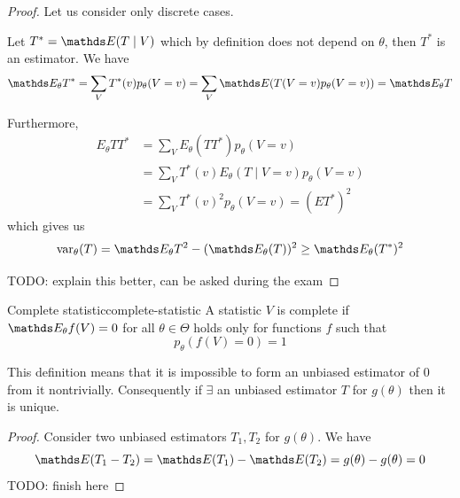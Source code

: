 \documentclass[12pt]{extarticle}
\begin{document}
\begin{proof}
	Let us consider only discrete cases.

	Let $T^* = \E(T\mid V)$ which by definition does not depend on $\theta$, then $T^*$ is an estimator.
	We have
	\begin{equation}
		\E_\theta T^* = \sum_V T^* (v) p_\theta(V = v) = \sum_V \E(T(V = v) p_\theta(V = v)) = \E_\theta T
	\end{equation}

	Furthermore,
	\begin{align}
		E_\theta T T^* & = \sum_V E_\theta(T T^*) p_\theta(V = v)                \\
		               & = \sum_V T^*(v) E_\theta(T \mid V = v) p_\theta (V = v) \\
		               & = \sum_V T^*(v)^2 p_\theta(V = v) = (ET^*)^2
	\end{align}
	which gives us
	\begin{equation}
		\var_\theta (T) = \E_\theta T^2 - (\E_\theta(T))^2 \geq \E_\theta (T^*)^2
	\end{equation}

	TODO: explain this better, can be asked during the exam
\end{proof}

\begin{definition}{Complete statistic}{complete-statistic}
	A statistic $V$ is complete if $\E_\theta f(V) = 0$ for all $\theta \in \Theta$
	holds only for functions $f$ such that
	\begin{equation}
		p_\theta(f(V) = 0) = 1
	\end{equation}
\end{definition}

This definition means that it is impossible to form an unbiased estimator of $0$ from it nontrivially.
Consequently if $\exists$ an unbiased estimator $T$ for $g(\theta)$ then it is unique.

\begin{proof}
	Consider two unbiased estimators $T_1, T_2$ for $g(\theta)$.
	We have
	\begin{equation}
		\E(T_1 - T_2) = \E(T_1) - \E(T_2) = g(\theta) - g(\theta) = 0
	\end{equation}
	TODO: finish here
\end{proof}
\end{document}
